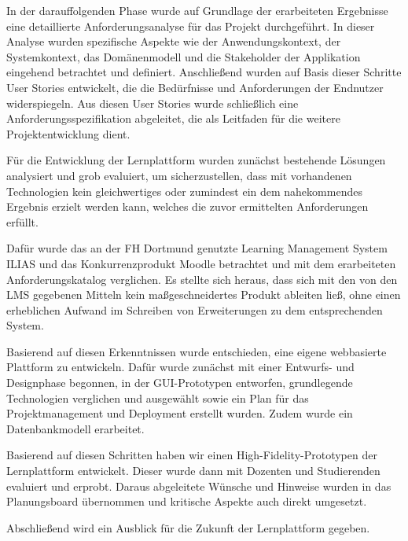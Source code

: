 In der darauffolgenden Phase wurde auf Grundlage der erarbeiteten Ergebnisse eine detaillierte Anforderungsanalyse für das Projekt durchgeführt. In dieser Analyse wurden spezifische Aspekte wie der Anwendungskontext, der Systemkontext, das Domänenmodell und die Stakeholder der Applikation eingehend betrachtet und definiert. Anschließend wurden auf Basis dieser Schritte User Stories entwickelt, die die Bedürfnisse und Anforderungen der Endnutzer widerspiegeln. Aus diesen User Stories wurde schließlich eine Anforderungsspezifikation abgeleitet, die als Leitfaden für die weitere Projektentwicklung dient.

Für die Entwicklung der Lernplattform wurden zunächst bestehende Lösungen analysiert und grob evaluiert, um sicherzustellen, dass mit vorhandenen Technologien kein gleichwertiges oder zumindest ein dem nahekommendes Ergebnis erzielt werden kann, welches die zuvor ermittelten Anforderungen erfüllt.

Dafür wurde das an der FH Dortmund genutzte Learning Management System ILIAS und das Konkurrenzprodukt Moodle betrachtet und mit dem erarbeiteten Anforderungskatalog verglichen. Es stellte sich heraus, dass sich mit den von den LMS gegebenen Mitteln kein maßgeschneidertes Produkt ableiten ließ, ohne einen erheblichen Aufwand im Schreiben von Erweiterungen zu dem entsprechenden System.

Basierend auf diesen Erkenntnissen wurde entschieden, eine eigene webbasierte Plattform zu entwickeln. Dafür wurde zunächst mit einer Entwurfs- und Designphase begonnen, in der GUI-Prototypen entworfen, grundlegende Technologien verglichen und ausgewählt sowie ein Plan für das Projektmanagement und Deployment erstellt wurden. Zudem wurde ein Datenbankmodell erarbeitet.

Basierend auf diesen Schritten haben wir einen High-Fidelity-Prototypen der Lernplattform entwickelt. Dieser wurde dann mit Dozenten und Studierenden evaluiert und erprobt. Daraus abgeleitete Wünsche und Hinweise wurden in das Planungsboard übernommen und kritische Aspekte auch direkt umgesetzt.

Abschließend wird ein Ausblick für die Zukunft der Lernplattform gegeben.